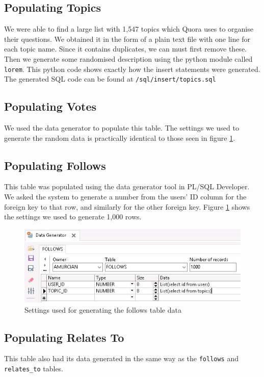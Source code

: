 \subsection{Populating Topics}

We were able to find a large list with 1,547 topics which Quora uses to organise their questions. We obtained it in the form of a plain text file with one line for each topic name. Since it contains duplicates, we can must first remove these. Then we generate some randomised description using the python module called \verb`lorem`. This python code shows exactly how the insert statements were generated. The generated SQL code can be found at \verb`/sql/insert/topics.sql`


\subsection{Populating Votes}

We used the data generator to populate this table. The settings we used to generate the random data is practically identical to those seen in figure \ref{follows-generator}.

\subsection{Populating Follows}

This table was populated using the data generator tool in PL/SQL Developer. We asked the system to generate a number from the users' ID column for the foreign key to that row, and similarly for the other foreign key. Figure \ref{follows-generator} shows the settings we used to generate 1,000 rows.

\begin{figure}[htbp]
	\centering
	\includegraphics[width=\linewidth]{images/follows_generator.jpeg}
	\caption{Settings used for generating the follows table data}
	\label{follows-generator}
\end{figure}

\subsection{Populating Relates To}

This table also had its data generated in the same way as the \verb`follows` and \verb`relates_to` tables.
